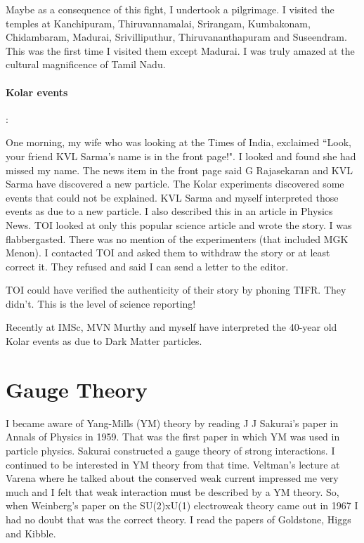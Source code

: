 Maybe as a consequence of this fight, I undertook a pilgrimage. I 
visited the temples at Kanchipuram, Thiruvannamalai, Srirangam, 
Kumbakonam, Chidambaram, Madurai, Srivilliputhur, Thiruvananthapuram and 
Suseendram. This was the first time I visited them except Madurai. I was 
truly amazed at the cultural magnificence of Tamil Nadu.

\paragraph{Kolar events}:

One morning, my wife who was looking at the Times of India, exclaimed 
``Look, your friend KVL Sarma's name is in the front page!". I looked and 
found she had missed my name. The news item in the front page said G 
Rajasekaran and KVL Sarma have discovered a new particle. The Kolar 
experiments discovered some events that could not be explained. KVL 
Sarma and myself interpreted those events as due to a new particle. I 
also described this in an article in Physics News. TOI looked at only 
this popular science article and wrote the story. I was flabbergasted. 
There was no mention of the experimenters (that included MGK Menon). I 
contacted TOI and asked them to withdraw the story or at least correct 
it. They refused and said I can send a letter to the editor.

TOI could have verified the authenticity of their story by phoning TIFR. 
They didn't. This is the level of science reporting!

Recently at IMSc, MVN Murthy and myself have interpreted the 40-year old 
Kolar events as due to Dark Matter particles.

\section*{Gauge Theory}

I became aware of Yang-Mills (YM) theory by reading J J Sakurai's paper 
in Annals of Physics in 1959. That was the first paper in which YM was 
used in particle physics. Sakurai constructed a gauge theory of strong 
interactions. I continued to be interested in YM theory from that time. 
Veltman's lecture at Varena where he talked about the conserved weak 
current impressed me very much and I felt that weak interaction must be 
described by a YM theory. So, when Weinberg's paper on the SU(2)xU(1) 
electroweak theory came out in 1967 I had no doubt that was the correct 
theory. I read the papers of Goldstone, Higgs and Kibble.

